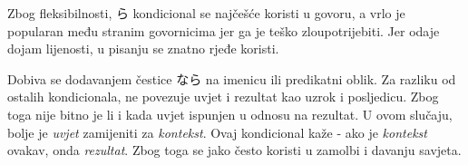 	Zbog fleksibilnosti, ら kondicional se najčešće koristi u govoru, a vrlo je popularan među stranim govornicima jer ga je teško zloupotrijebiti. Jer odaje dojam lijenosti, u pisanju se znatno rjeđe koristi.
	
	
	Dobiva se dodavanjem čestice なら na imenicu ili predikatni oblik. Za razliku od ostalih kondicionala, ne povezuje uvjet i rezultat kao uzrok i posljedicu. Zbog toga nije bitno je li i kada uvjet ispunjen u odnosu na rezultat. U ovom slučaju, bolje je \textit{uvjet} zamijeniti za \textit{kontekst}. Ovaj kondicional kaže - ako je \textit{kontekst} ovakav, onda \textit{rezultat}. Zbog toga se jako često koristi u zamolbi i davanju savjeta.
	
	\begin{reibun}
	\end{reibun}

